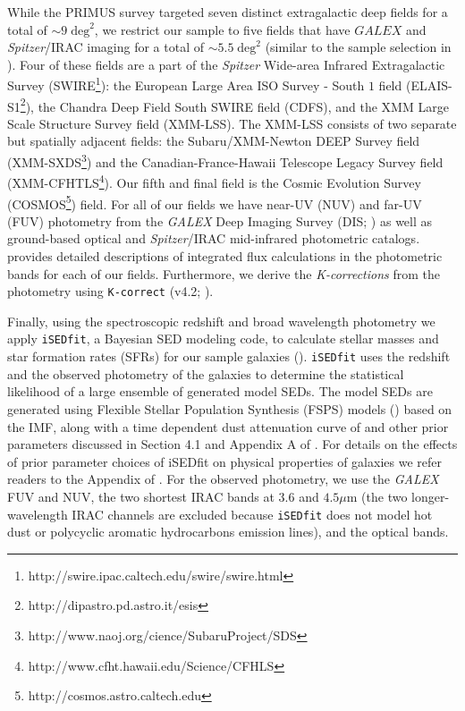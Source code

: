 While the PRIMUS survey targeted seven distinct extragalactic deep fields for a total of $\sim 9 \; \mathrm{deg}^2$, we restrict our sample to five fields that have $GALEX$ and {\em Spitzer}/IRAC imaging for a total of $\sim 5.5 \; \mathrm{deg}^2$ (similar to the sample selection in \citealt{Moustakas:2013aa}). Four of these fields are a part of the {\em Spitzer} Wide-area Infrared Extragalactic Survey (SWIRE\footnote{http://swire.ipac.caltech.edu/swire/swire.html}): the European Large Area ISO Survey - South $1$ field (ELAIS-S1\footnote{http://dipastro.pd.astro.it/esis}), the Chandra Deep Field South SWIRE field (CDFS), and the XMM Large Scale Structure Survey field (XMM-LSS). The XMM-LSS consists of two separate but spatially adjacent fields: the Subaru/XMM-Newton DEEP Survey field (XMM-SXDS\footnote{http://www.naoj.org/cience/SubaruProject/SDS}) and the Canadian-France-Hawaii Telescope Legacy Survey field (XMM-CFHTLS\footnote{http://www.cfht.hawaii.edu/Science/CFHLS}). Our fifth and final field is the Cosmic Evolution Survey (COSMOS\footnote{http://cosmos.astro.caltech.edu}) field. For all of our fields we have near-UV (NUV) and far-UV (FUV) photometry from the {\em GALEX} Deep Imaging Survey (DIS; \citealt{Martin:2005aa, Morrissey:2005aa}) as well as ground-based optical and {\em Spitzer}/IRAC mid-infrared photometric catalogs. \cite{Moustakas:2013aa} provides detailed descriptions of integrated flux calculations in the photometric bands for each of our fields. Furthermore, we derive the {\em K-corrections} from the photometry using \texttt{K-correct} (v4.2; \citealt{Blanton:2007aa}). 

Finally, using the spectroscopic redshift and broad wavelength photometry we apply \texttt{iSEDfit}, a Bayesian SED modeling code, to calculate stellar masses and star formation rates (SFRs) for our sample galaxies (\citealt{Moustakas:2013aa}). \texttt{iSEDfit} uses the redshift and the observed photometry of the galaxies to determine the statistical likelihood of a large ensemble of generated model SEDs. The model SEDs are generated using Flexible Stellar Population Synthesis (FSPS) models (\citealt{Conroy:2010aa}) based on the \cite{Chabrier:2003aa} IMF, along with a time dependent dust attenuation curve of \cite{Charlot:2000aa} and other prior parameters discussed in Section 4.1 and Appendix A of \cite{Moustakas:2013aa}. For details on the effects of prior parameter choices of iSEDfit on physical properties of galaxies we refer readers to the Appendix of \cite{Moustakas:2013aa}. For the observed photometry, we use the {\em GALEX} FUV and NUV, the two shortest IRAC bands at $3.6$ and $4.5 \mu \mathrm{m}$ (the two longer-wavelength IRAC channels are excluded because \texttt{iSEDfit} does not model hot dust or polycyclic aromatic hydrocarbons emission lines), and the optical bands. 

